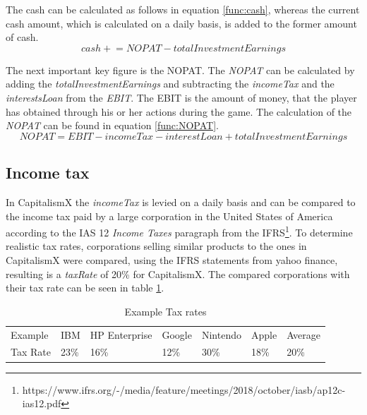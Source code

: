 The cash can be calculated as follows in equation \ref{func:cash}, whereas the current cash amount, which is calculated on a daily basis, is added to the former amount of cash.
\begin{equation}
    \label{func:cash}
    cash \mathrel{+}= NOPAT - totalInvestmentEarnings %
\end{equation}

The next important key figure is the \gls{NOPAT}. The \textit{NOPAT} can be calculated by adding the \textit{totalInvestmentEarnings} and subtracting the \textit{incomeTax} and the \textit{interestsLoan} from the \textit{EBIT}. The \gls{EBIT} is the amount of money, that the player has obtained through his or her actions during the game. The calculation of the \textit{NOPAT} can be found in equation \ref{func:NOPAT}.
\begin{equation}
    \label{func:NOPAT}
    NOPAT = EBIT - incomeTax - interestLoan + totalInvestmentEarnings
\end{equation}
 
\subsection{Income tax}
\label{sec:incomeTax}

In CapitalismX the \textit{incomeTax} is levied on a daily basis and can be compared to the income tax paid by a large corporation in the United States of America according to the IAS 12 \textit{Income Taxes} paragraph from the IFRS\footnote{https://www.ifrs.org/-/media/feature/meetings/2018/october/iasb/ap12c-ias12.pdf}. To determine realistic tax rates, corporations selling similar products to the ones in CapitalismX were compared, using the IFRS statements from yahoo finance, resulting is a \textit{taxRate} of 20\% for CapitalismX. The compared corporations with their tax rate can be seen in table \ref{Example_Tax}.

\begin{table}[!htbp]
\centering
\begin{tabular}{|l|l|l|l|l|l|l|}
\hline
Example & IBM & HP Enterprise & Google & Nintendo & Apple & Average \\
Tax Rate & 23\% & 16\% & 12\% & 30\% & 18\% & 20\% \\ \hline
\end{tabular}
\caption{Example Tax rates}
\label{Example_Tax}
\end{table}

